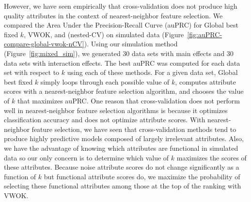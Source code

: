 \documentclass[10pt,letterpaper]{article}
\begin{document}
However, we have seen empirically that cross-validation does not produce high quality attributes in the context of nearest-neighbor feature selection. We compared the Area Under the Precision-Recall Curve (auPRC) for Global best fixed $k$, VWOK, and (nested-CV) on simulated data (Figure~\ref{fig:auPRC-compare-global-vwok-nCV}). Using our simulation method (Figure~\ref{fig:mixed_sim}), we generated 30 data sets with main effects and 30 data sets with interaction effects. The best auPRC was computed for each data set with respect to $k$ using each of these methods. For a given data set, Global best fixed $k$ simply loops through each possible value of $k$, computes attribute scores with a nearest-neighbor feature selection algorithm, and chooses the value of $k$ that maximizes auPRC. One reason that cross-validation does not perform well in nearest-neighbor feature selection algorithms is because it optimizes classification accuracy and does not optimize attribute scores. With nearest-neighbor feature selection, we have seen that cross-validation methods tend to produce highly predictive models composed of largely irrelevant attributes. Also, we have the advantage of knowing which attributes are functional in simulated data so our only concern is to determine which value of $k$ maximizes the scores of these attributes. Because noise attribute scores do not change significantly as a function of $k$ but functional attribute scores do, we maximize the probability of selecting these functional attributes among those at the top of the ranking with VWOK. 
\end{document}
